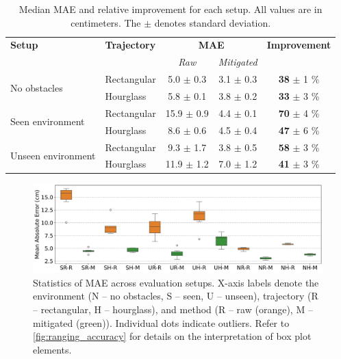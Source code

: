 \begin{table}[tbh]
\centering
\caption[Median error and relative improvement for each setup.]{Median MAE and relative improvement for each setup. All values are in centimeters. The $\pm$ denotes standard deviation.}
\label{tab:mae-improvement}
\begin{tabular}{llccc}
\toprule
\textbf{Setup} & \textbf{Trajectory} & \multicolumn{2}{c}{\textbf{MAE}} & \textbf{Improvement} \\
\cmidrule(lr){3-4}
 & & \textit{Raw} & \textit{Mitigated} & \\
\midrule
\multirow{2}{*}{No obstacles} 
  & Rectangular &  5.0 $\pm$ 0.3 & 3.1 $\pm$ 0.3 & \textbf{38} $\pm$ 1 \% \\
  & Hourglass   &  5.8 $\pm$ 0.1 & 3.8 $\pm$ 0.2 & \textbf{33} $\pm$ 3 \% \\
\midrule
\multirow{2}{*}{Seen environment} 
  & Rectangular & 15.9 $\pm$ 0.9 & 4.4 $\pm$ 0.1 & \textbf{70} $\pm$ 4 \% \\
  & Hourglass   &  8.6 $\pm$ 0.6 & 4.5 $\pm$ 0.4 & \textbf{47} $\pm$ 6 \% \\
\midrule
\multirow{2}{*}{Unseen environment} 
  & Rectangular &  9.3 $\pm$ 1.7 & 3.8 $\pm$ 0.5 & \textbf{58} $\pm$ 3 \% \\
  & Hourglass   & 11.9 $\pm$ 1.2 & 7.0 $\pm$ 1.2 & \textbf{41} $\pm$ 3 \% \\
\bottomrule
\end{tabular}
\end{table}

\begin{figure}[tbh]
    \centering
    \includegraphics[width=\textwidth]{Figures/experiments_and_results/dtw_errors_mae_box.pdf}
    \caption[Statistics of mean absolute error across all evaluation setups.]{Statistics of MAE across evaluation setups. X-axis labels denote the environment (N -- no obstacles, S -- seen, U -- unseen), trajectory (R -- rectangular, H -- hourglass), and method (R -- raw (orange), M -- mitigated (green)). Individual dots indicate outliers. Refer to \autoref{fig:ranging_accuracy} for details on the interpretation of box plot elements.}
    \label{fig:dtw_errors_mae_box}
\end{figure}

